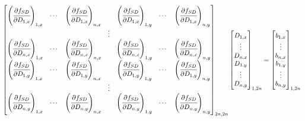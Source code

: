 \documentclass{article}
\begin{document}
\begin{equation}
\label{eq:axb}
    \begin{bmatrix}
    \Bigg( \cfrac{\partial f_{SD}}{\partial D_{1,x}} \Bigg) _{1,x} &
    \cdots &
    \Bigg( \cfrac{\partial f_{SD}}{\partial D_{1,x}} \Bigg) _{n,x} &
     &
    \Bigg( \cfrac{\partial f_{SD}}{\partial D_{1,x}} \Bigg) _{1,y} &
    \cdots &
    \Bigg( \cfrac{\partial f_{SD}}{\partial D_{1,x}} \Bigg) _{n,y} 
    \\
     & & & \vdots & & & 
    \\
    \Bigg( \cfrac{\partial f_{SD}}{\partial D_{n,x}} \Bigg) _{1,x} &
    \cdots &
    \Bigg( \cfrac{\partial f_{SD}}{\partial D_{n,x}} \Bigg) _{n,x} &
     &
    \Bigg( \cfrac{\partial f_{SD}}{\partial D_{n,x}} \Bigg) _{1,y} &
    \cdots &
    \Bigg( \cfrac{\partial f_{SD}}{\partial D_{n,x}} \Bigg) _{n,y} 
    \\
    \Bigg( \cfrac{\partial f_{SD}}{\partial D_{1,y}} \Bigg) _{1,x} &
    \cdots &
    \Bigg( \cfrac{\partial f_{SD}}{\partial D_{1,y}} \Bigg) _{n,x} &
     &
    \Bigg( \cfrac{\partial f_{SD}}{\partial D_{1,y}} \Bigg) _{1,y} &
    \cdots &
    \Bigg( \cfrac{\partial f_{SD}}{\partial D_{1,y}} \Bigg) _{n,y} 
    \\
     & & & \vdots & & & 
    \\
    \Bigg( \cfrac{\partial f_{SD}}{\partial D_{n,y}} \Bigg) _{1,x} &
    \cdots &
    \Bigg( \cfrac{\partial f_{SD}}{\partial D_{n,y}} \Bigg) _{n,x} &
     &
    \Bigg( \cfrac{\partial f_{SD}}{\partial D_{n,y}} \Bigg) _{1,y} &
    \cdots &
    \Bigg( \cfrac{\partial f_{SD}}{\partial D_{n,y}} \Bigg) _{n,y} 
    \end{bmatrix}_{2n,2n}
    \begin{bmatrix}
        D_{1,x} \\
        \vdots \\
        D_{n,x} \\
        D_{1,y} \\
        \vdots \\
        D_{n,y} 
    \end{bmatrix}_{1,2n}
    =
    \begin{bmatrix}
        b_{1,x} \\
        \vdots \\
        b_{n,x} \\
        b_{1,y} \\
        \vdots \\
        b_{n,y} 
    \end{bmatrix}_{1,2n}
\end{equation}
\end{document}
